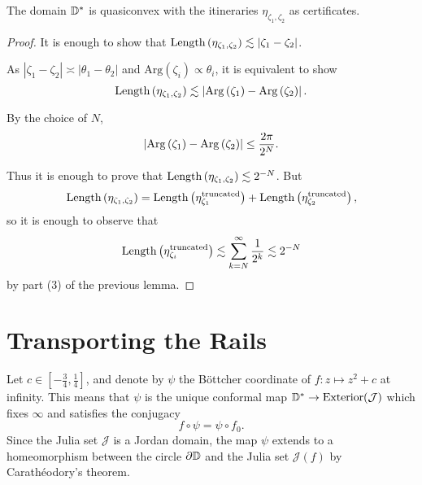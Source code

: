 \begin{theorem} \label{quasiconvex disk}
The domain $\mathbb{D}^{*}$ is quasiconvex with the itineraries $\eta_{\zeta_1,\zeta_2}$ as certificates.
\end{theorem}

\begin{proof}
It is enough to show that $\operatorname{Length}\left(\eta_{\zeta_{1},\zeta_{2}}\right)\lesssim\left|\zeta_{1}-\zeta_{2}\right|$.

As $\left|\zeta_{1}-\zeta_{2}\right|\asymp\left|\theta_{1}-\theta_{2}\right|$
and $\mathrm{Arg}\left(\zeta_{i}\right)\propto\theta_{i}$, it is equivalent to show
\[
\operatorname{Length}\left(\eta_{\zeta_{1},\zeta_{2}}\right)\lesssim\left|\operatorname{Arg}\left(\zeta_{1}\right)-\operatorname{Arg}\left(\zeta_{2}\right)\right|.
\]

By the choice of $N$, 
\[
\left|\operatorname{Arg}\left(\zeta_{1}\right)-\operatorname{Arg}\left(\zeta_{2}\right)\right|\leq\frac{2\pi}{2^{N}}.
\]

Thus it is enough to prove that $\operatorname{Length}\left(\eta_{\zeta_{1},\zeta_{2}}\right)\lesssim2^{-N}$.
But 
\[
\operatorname{Length}\left(\eta_{\zeta_{1},\zeta_{2}}\right)=\operatorname{Length}\left(\eta_{\zeta_{1}}^{\text{truncated}}\right)+\operatorname{Length}\left(\eta_{\zeta_{2}}^{\text{truncated}}\right),
\]
so it is enough to observe that 
\[
\operatorname{Length}\left(\eta_{\zeta_{i}}^{\text{truncated}}\right)\lesssim\sum_{k=N}^{\infty}\frac{1}{2^{k}}\lesssim2^{-N}
\]
by part (3) of the previous lemma.

\end{proof}









\section{Transporting the Rails} \label{rails-section}
Let $c\in\left[-\frac 34,\frac{1}{4}\right]$, and denote by $\psi$ the Böttcher coordinate of $f: z\mapsto z^2+c$ at infinity. 
This means that $\psi$ is the unique conformal map $\mathbb{D}^{*}\to\mathrm{Exterior}(\mathcal{J})$  which fixes $\infty$ and satisfies the conjugacy $$f\circ\psi=\psi\circ f_{0}.$$
Since the Julia set $\mathcal J$ is a Jordan domain, the map $\psi$ extends to a homeomorphism between the circle
$\partial\mathbb{D}$ and the Julia set $\mathcal{J}(f)$ by Carathéodory's
theorem.

